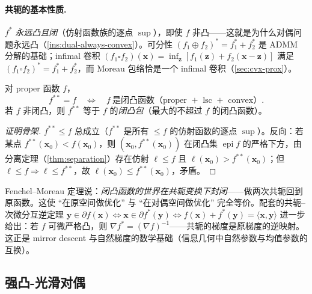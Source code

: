 \paragraph{共轭的基本性质.}\;$f^\ast$ \emph{永远凸且闭}（仿射函数族的逐点 $\sup$），即使 $f$ 非凸——这就是为什么对偶问题永远凸（\cref{ins:dual-always-convex}）。可分性 $(f_1\oplus f_2)^\ast=f_1^\ast+f_2^\ast$ 是 ADMM 分解的基础；infimal 卷积 $(f_1\square f_2)(\mathbf x)=\inf_{\mathbf z}[f_1(\mathbf z)+f_2(\mathbf x-\mathbf z)]$ 满足 $(f_1\square f_2)^\ast=f_1^\ast+f_2^\ast$，而 Moreau 包络恰是一个 infimal 卷积（\cref{sec:cvx-prox}）。

\begin{theorem}\label{thm:fenchel-moreau}
对 proper 函数 $f$，
\begin{equation}
  f^{\ast\ast}=f\quad\Longleftrightarrow\quad f\ \text{是闭凸函数（proper $+$ lsc $+$ convex）}.
  \label{eq:fenchel-moreau}
\end{equation}
若 $f$ 非闭凸，则 $f^{\ast\ast}$ 等于 $f$ 的\emph{闭凸包}（最大的不超过 $f$ 的闭凸函数）。
\end{theorem}
\begin{proof}[证明骨架]
$f^{\ast\ast}\le f$ 总成立（$f^{\ast\ast}$ 是所有 $\le f$ 的仿射函数的逐点 $\sup$）。反向：若某点 $f^{\ast\ast}(\mathbf x_0)<f(\mathbf x_0)$，则 $(\mathbf x_0,f^{\ast\ast}(\mathbf x_0))$ 在闭凸集 $\operatorname{epi}f$ 的严格下方，由分离定理（\cref{thm:separation}）存在仿射 $\ell\le f$ 且 $\ell(\mathbf x_0)>f^{\ast\ast}(\mathbf x_0)$；但 $\ell\le f\Rightarrow\ell\le f^{\ast\ast}$，故 $\ell(\mathbf x_0)\le f^{\ast\ast}(\mathbf x_0)$，矛盾。
\end{proof}

\begin{insight}[闭凸世界在共轭下封闭]\label{ins:fenchel-moreau}
Fenchel--Moreau 定理说：\emph{闭凸函数的世界在共轭变换下封闭}——做两次共轭回到原函数。这使 “在原空间做优化” 与 “在对偶空间做优化” 完全等价。配套的共轭--次微分互逆定理 $\mathbf y\in\partial f(\mathbf x)\iff\mathbf x\in\partial f^\ast(\mathbf y)\iff f(\mathbf x)+f^\ast(\mathbf y)=\langle\mathbf x,\mathbf y\rangle$ 进一步给出：若 $f$ 可微严格凸，则 $\nabla f^\ast=(\nabla f)^{-1}$——共轭的梯度是原梯度的逆映射。这正是 mirror descent 与自然梯度的数学基础（信息几何中自然参数与均值参数的互换）。
\end{insight}

\subsection{强凸-光滑对偶}
\label{subsec:cvx-strong-smooth-dual}

